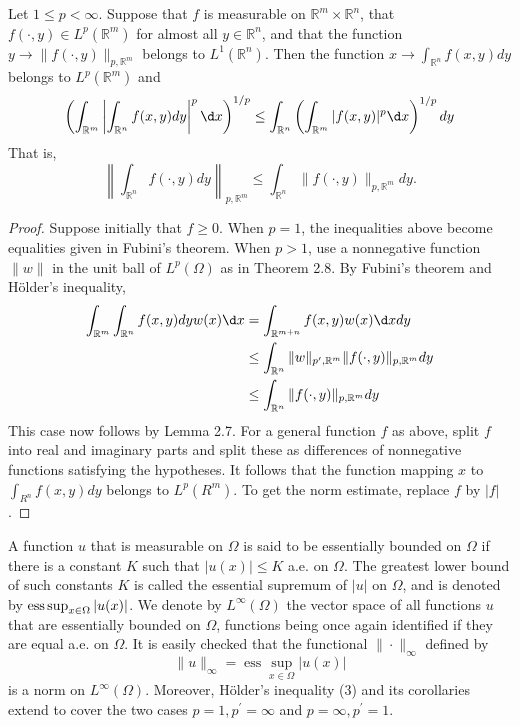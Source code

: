 \begin{theorem}
  Let $1 \leq p<\infty$. Suppose that $f$ is measurable on $\mathbb{R}^m \times \mathbb{R}^n$, 
  that $f(\cdot, y) \in L^p\left(\mathbb{R}^m\right)$ for almost all $y \in \mathbb{R}^n$,
  and that the function $y \rightarrow\|f(\cdot, y)\|_{p, \mathbb{R}^m}$ belongs to $L^1(\mathbb{R}^n)$. Then the function $x \rightarrow \int_{\mathbb{R}^n} f(x, y) d y$ belongs to $L^p\left(\mathbb{R}^m\right)$ and
  \[
  \left(\int_{\mathbb{R}^m}\left|\int_{\mathbb{R}^n} f(x, y) d y\right|^p \d x\right)^{1 / p} \leq \int_{\mathbb{R}^n}\left(\int_{\mathbb{R}^m}|f(x, y)|^p \d x\right)^{1 / p} d y
  \]
  That is,
  \[
  \left\|\int_{\mathbb{R}^n} f(\cdot, y) d y\right\|_{p, \mathbb{R}^m} \leq \int_{\mathbb{R}^n}\|f(\cdot, y)\|_{p, \mathbb{R}^m} d y .
  \]
\end{theorem}

\begin{proof}
  Suppose initially that $f \geq 0$. When $p=1$, the inequalities above become equalities given in Fubini's theorem. When $p>1$, use a nonnegative function $\|w\|$ in the unit ball of $L^p(\Omega)$ as in Theorem 2.8. By Fubini's theorem and Hölder's inequality,
  \[
  \begin{aligned}
  \int_{\mathbb{R}^m} \int_{\mathbb{R}^n} f(x, y) d y w(x) \d x & =\int_{\mathbb{R}^{m+n}} f(x, y) w(x) \d x d y \\
  & \leq \int_{\mathbb{R}^n}\|w\|_{p^{\prime}, \mathbb{R}^m}\|f(\cdot, y)\|_{p, \mathbb{R}^m} d y \\
  & \leq \int_{\mathbb{R}^n}\|f(\cdot, y)\|_{p, \mathbb{R}^m} d y
  \end{aligned}
  \]
  This case now follows by Lemma 2.7. For a general function $f$ as above, split $f$ into real and imaginary parts and split these as differences of nonnegative functions satisfying the hypotheses. It follows that the function mapping $x$ to $\int_{R^n} f(x, y) d y$ belongs to $L^p\left(R^m\right)$. To get the norm estimate, replace $f$ by $|f|$.
\end{proof}


\begin{para}
  A function $u$ that is measurable on $\Omega$ is said to be essentially bounded on $\Omega$ if 
  there is a constant $K$ such that $|u(x)| \leq K$ a.e. on $\Omega$. The greatest lower bound of 
  such constants $K$ is called the essential supremum of $|u|$ on $\Omega$, and is denoted by
  $\operatorname{ess\,sup}_{x \in \Omega}|u(x)|$. We denote by $L^{\infty}(\Omega)$ the vector space of all functions $u$ that are essentially bounded on $\Omega$, functions being once again identified if they are equal a.e. on $\Omega$. It is easily checked that the functional $\|\cdot\|_{\infty}$ defined by
  \[
  \|u\|_{\infty}=\operatorname{ess} \sup _{x \in \Omega}|u(x)|
  \]
  is a norm on $L^{\infty}(\Omega)$. Moreover, Hölder's inequality (3) and its corollaries extend to cover the two cases $p=1, p^{\prime}=\infty$ and $p=\infty, p^{\prime}=1$.
\end{para}

